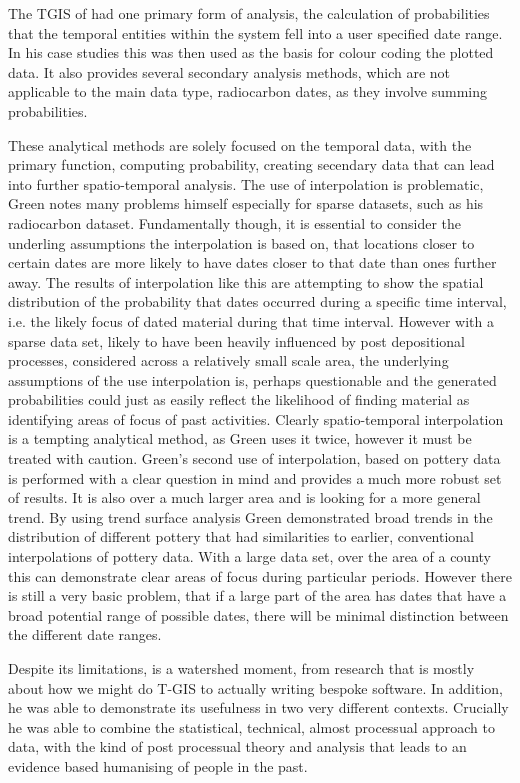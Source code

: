 The TGIS of \citet{Green:2008fk} had one primary form of analysis, the calculation of probabilities that the temporal entities within the system fell into a user specified date range. In his case studies this was then used as the basis for colour coding the plotted data. It also provides several secondary analysis methods, which are not applicable to the main data type, radiocarbon dates, as they involve summing probabilities.

These analytical methods are solely focused on the temporal data, with the primary function, computing probability, creating secendary data that can lead into further spatio-temporal analysis. The use of interpolation is problematic, Green notes many problems himself \citep[189]{Green:2008fk} especially for sparse datasets, such as his radiocarbon dataset. Fundamentally though, it is essential to consider the underling assumptions the interpolation is based on, that locations closer to certain dates are more likely to have dates closer to that date than ones further away. The results of interpolation like this are attempting to show the spatial distribution of the probability that dates occurred during a specific time interval, i.e. the likely focus of dated material during that time interval. However with a sparse data set, likely to have been heavily influenced by post depositional processes, considered across a relatively small scale area, the underlying assumptions of the use interpolation is, perhaps questionable and the generated probabilities could just as easily reflect the likelihood of finding material as identifying areas of focus of past activities. Clearly spatio-temporal interpolation is a tempting analytical method, as Green uses it twice, however it must be treated with caution. Green's second use of interpolation, \citet[206]{Green:2008fk} based on pottery data is performed with a clear question in mind and provides a much more robust set of results. It is also over a much larger area and is looking for a more general trend. By using trend surface analysis Green demonstrated broad trends in the distribution of different pottery that had similarities to earlier, conventional interpolations of pottery data. With a large data set, over the area of a county this can demonstrate clear areas of focus during particular periods. However there is still a very basic problem, that if a large part of the area has dates that have a broad potential range of possible dates, there will be minimal distinction between the different date ranges. 

Despite its limitations, \citet{Green:2008fk} is a watershed moment, from research that is mostly about how we might do T-GIS to actually writing bespoke software. In addition, he was able to demonstrate its usefulness in two very different contexts. Crucially he was able to combine the statistical, technical, almost processual approach to data, with the kind of post processual theory and analysis that leads to an evidence based humanising of people in the past.

